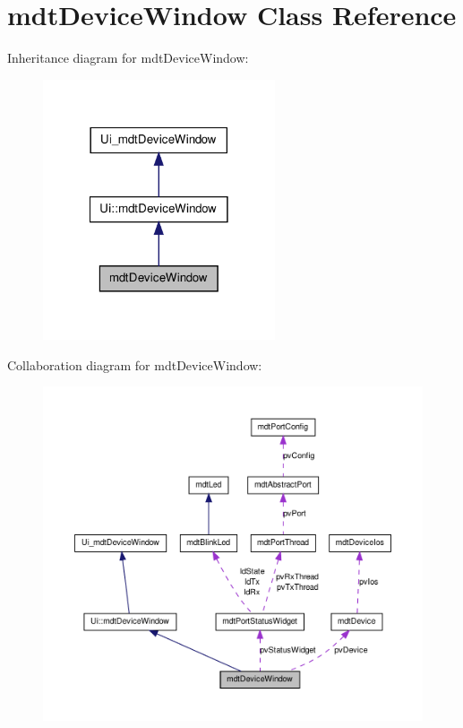 \hypertarget{classmdt_device_window}{
\section{mdtDeviceWindow Class Reference}
\label{classmdt_device_window}
}


Inheritance diagram for mdtDeviceWindow:\nopagebreak
\begin{figure}[H]
\begin{center}
\leavevmode
\includegraphics[width=194pt]{classmdt_device_window__inherit__graph}
\end{center}
\end{figure}


Collaboration diagram for mdtDeviceWindow:\nopagebreak
\begin{figure}[H]
\begin{center}
\leavevmode
\includegraphics[width=400pt]{classmdt_device_window__coll__graph}
\end{center}
\end{figure}
